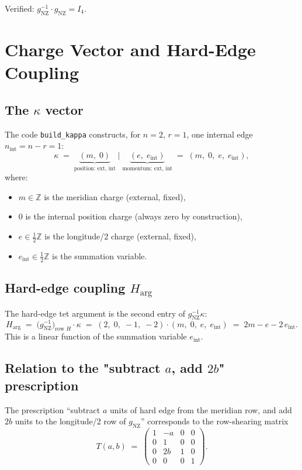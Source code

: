 \documentclass[12pt,a4paper]{article}
\newcommand{\gNZ}{g_{\mathrm{NZ}}}
\newcommand{\ZZ}{\mathbb{Z}}
\theoremstyle{definition}
\begin{document}
\noindent
Verified: $\gNZ^{-1} \cdot \gNZ = I_4$. \checkmark

\section{Charge Vector and Hard-Edge Coupling}
\label{sec:no-effect}

\subsection{The \texorpdfstring{$\kappa$}{kappa} vector}

The code \texttt{build\_kappa} constructs, for $n=2$, $r=1$, one internal edge
$n_{\mathrm{int}} = n - r = 1$:
\[
  \kappa \;=\;
  \underbrace{(m,\;0)}_{\text{position: ext, int}}
  \;\Big|\;
  \underbrace{(e,\;e_{\mathrm{int}})}_{\text{momentum: ext, int}}
  \;=\; (m,\;0,\;e,\;e_{\mathrm{int}}),
\]
where:
\begin{itemize}
  \item $m \in \ZZ$ is the meridian charge (external, fixed),
  \item $0$ is the internal position charge (always zero by construction),
  \item $e \in \tfrac{1}{2}\ZZ$ is the longitude/2 charge (external, fixed),
  \item $e_{\mathrm{int}} \in \tfrac{1}{2}\ZZ$ is the summation variable.
\end{itemize}

\subsection{Hard-edge coupling \texorpdfstring{$H_{\mathrm{arg}}$}{H\_arg}}

The hard-edge tet argument is the second entry of $\gNZ^{-1} \kappa$:
\[
  H_{\mathrm{arg}} \;=\; \bigl(\gNZ^{-1}\bigr)_{\text{row }H} \cdot \kappa
  \;=\; (2,\;0,\;-1,\;-2) \cdot (m,\;0,\;e,\;e_{\mathrm{int}})
  \;=\; 2m - e - 2\,e_{\mathrm{int}}.
\]
This is a linear function of the summation variable $e_{\mathrm{int}}$.

\subsection{Relation to the "subtract \texorpdfstring{$a$, add $2b$}{a, 2b}" prescription}

The prescription ``subtract $a$ units of hard edge from the meridian row,
and add $2b$ units to the longitude/2 row of $\gNZ$'' corresponds to the
row-shearing matrix
\[
  T(a,b) \;=\;
  \begin{pmatrix}
    1 & {-a} & 0 & 0 \\
    0 &   1  & 0 & 0 \\
    0 &  2b  & 1 & 0 \\
    0 &   0  & 0 & 1
  \end{pmatrix}.
\]
\end{document}
